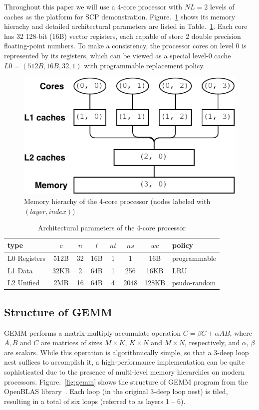 Throughout this paper we will use a 4-core processor with
$NL=2$ levels of caches as the platform for SCP demonstration.
Figure.~\ref{fig:hierachy} shows its memory hierachy and
detailed architectural parameters are listed in Table.~\ref{tab:cluster}.
Each core has 32 128-bit (16B) vector registers,
each capable of store 2 double precision floating-point numbers.
To make a consistency, the processor cores on level 0
is represented by its registers, which can be viewed as a special
level-0 cache $L0 = (512B, 16B, 32, 1)$ with programmable replacement policy.

\begin{figure}
  \centering
  \includegraphics[width=.45\textwidth]{figures/cluster-new}
  \caption{Memory hierachy of the 4-core processor
    (nodes labeled with $(layer,index)$)}
  \label{fig:hierachy}
\end{figure}

\begin{table}
  \centering
  \caption{Architectural parameters of the 4-core processor}
  \label{tab:cluster}
  \begin{tabular}{lccccccl}
    \toprule
    type & $c$ & $n$ & $l$ & $nt$ & $ns$ & $wc$ & policy \\
    \midrule
    L0 Registers  & 512B & 32 & 16B & 1 & 1 & 16B & programmable \\
    L1 Data    & 32KB & 2  & 64B & 1 & 256 & 16KB & LRU \\
    L2 Unified & 2MB  & 16 & 64B & 4 & 2048 & 128KB & psudo-random \\
    \bottomrule
  \end{tabular}
\end{table}

\subsection{Structure of GEMM}\label{subsec:gemm}

GEMM performs a matrix-multiply-accumulate operation $C = \beta C + \alpha A B$,
where $A, B$ and $C$ are matrices of sizes
$M \times K$, $K \times N$ and $M \times N$, respectively,
and $\alpha$, $\beta$ are scalars.
While this operation is algorithmically simple,
so that a 3-deep loop nest suffices to accomplish it,
a high-performance implementation can be quite
sophisticated due to the presence of multi-level memory
hierarchies on modern processors.
Figure.~\ref{fig:gemm} shows the structure of GEMM program from
the OpenBLAS library~\cite{openblas}.
Each loop (in the original 3-deep loop nest) is tiled,
resulting in a total of six loops (referred to as layers 1 -- 6).

